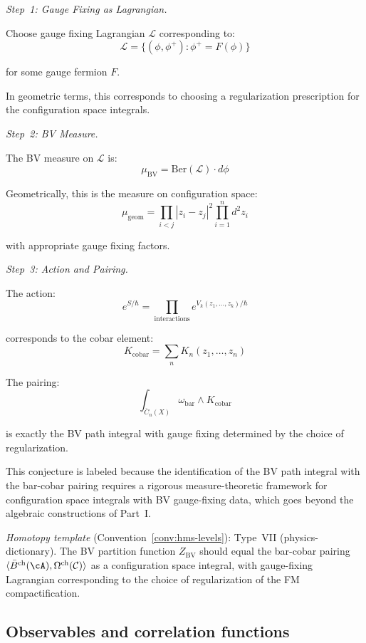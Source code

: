 \begin{evidence}
\emph{Step~1: Gauge Fixing as Lagrangian.}

Choose gauge fixing Lagrangian $\mathcal{L}$ corresponding to:
\[\mathcal{L} = \{(\phi, \phi^+) : \phi^+ = F(\phi)\}\]

for some gauge fermion $F$.

In geometric terms, this corresponds to choosing a regularization prescription 
for the configuration space integrals.

\emph{Step~2: BV Measure.}

The BV measure on $\mathcal{L}$ is:
\[\mu_{\text{BV}} = \text{Ber}(\mathcal{L}) \cdot d\phi\]

Geometrically, this is the measure on configuration space:
\[\mu_{\text{geom}} = \prod_{i<j} |z_i - z_j|^2 \prod_{i=1}^n d^2z_i\]

with appropriate gauge fixing factors.

\emph{Step~3: Action and Pairing.}

The action:
\[e^{S/\hbar} = \prod_{\text{interactions}} e^{V_k(z_1, \ldots, z_k)/\hbar}\]

corresponds to the cobar element:
\[K_{\text{cobar}} = \sum_n K_n(z_1, \ldots, z_n)\]

The pairing:
\[\int_{\overline{C}_n(X)} \omega_{\text{bar}} \wedge K_{\text{cobar}}\]

is exactly the BV path integral with gauge fixing determined by the choice of
regularization.
\end{evidence}

\begin{remark}[Scope]
This conjecture is labeled \ClaimStatusHeuristic{} because the identification of the
BV path integral with the bar-cobar pairing requires a rigorous measure-theoretic
framework for configuration space integrals with BV gauge-fixing data, which goes
beyond the algebraic constructions of Part~I.

\emph{Homotopy template} (Convention~\ref{conv:hms-levels}): Type~VII (physics-dictionary).
The BV partition function $Z_{\mathrm{BV}}$ should equal the bar-cobar pairing $\langle \bar{B}^{\mathrm{ch}}(\cA), \Omega^{\mathrm{ch}}(\mathcal{C}) \rangle$ as a configuration space integral, with gauge-fixing Lagrangian corresponding to the choice of regularization of the FM compactification.
\end{remark}

\subsection{Observables and correlation functions}

